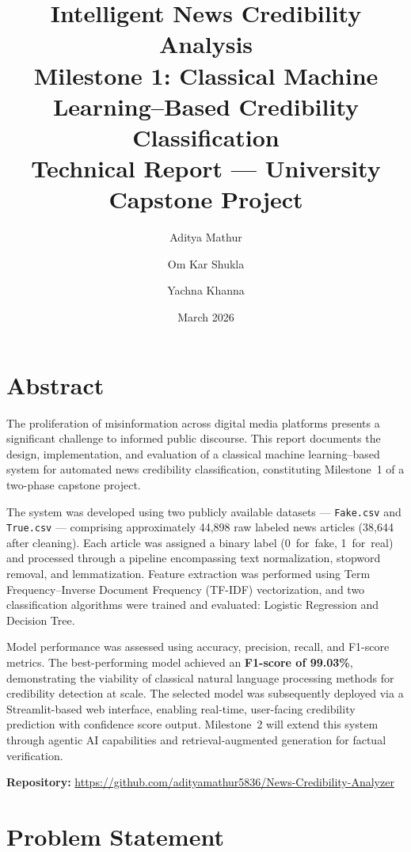 \documentclass[12pt, a4paper]{article}
\title{
    \vspace{-1cm}
    \textbf{\LARGE Intelligent News Credibility Analysis} \\[0.4cm]
    \large Milestone 1: Classical Machine Learning--Based Credibility Classification \\[0.3cm]
    \large Technical Report — University Capstone Project
}
\author{
    Aditya Mathur \and Om Kar Shukla \and Yachna Khanna
}
\date{March 2026}
\begin{document}
\maketitle
\thispagestyle{fancy}

\section{Abstract}

The proliferation of misinformation across digital media platforms presents a significant challenge to informed public discourse. This report documents the design, implementation, and evaluation of a classical machine learning--based system for automated news credibility classification, constituting Milestone~1 of a two-phase capstone project.

The system was developed using two publicly available datasets — \texttt{Fake.csv} and \texttt{True.csv} — comprising approximately 44,898 raw labeled news articles (38,644 after cleaning). Each article was assigned a binary label (0~for~fake, 1~for~real) and processed through a pipeline encompassing text normalization, stopword removal, and lemmatization. Feature extraction was performed using Term Frequency--Inverse Document Frequency (TF-IDF) vectorization, and two classification algorithms were trained and evaluated: Logistic Regression and Decision Tree.

Model performance was assessed using accuracy, precision, recall, and F1-score metrics. The best-performing model achieved an \textbf{F1-score of 99.03\%}, demonstrating the viability of classical natural language processing methods for credibility detection at scale. The selected model was subsequently deployed via a Streamlit-based web interface, enabling real-time, user-facing credibility prediction with confidence score output. Milestone~2 will extend this system through agentic AI capabilities and retrieval-augmented generation for factual verification.

\vspace{0.3cm}
\noindent\textbf{Repository:} \url{https://github.com/adityamathur5836/News-Credibility-Analyzer}

\section{Problem Statement}
\end{document}
